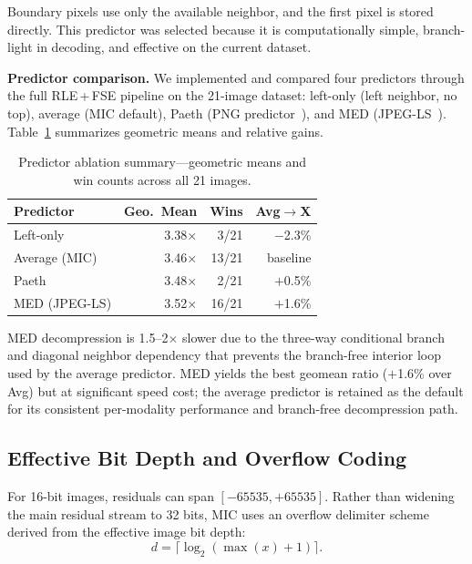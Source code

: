 \documentclass[journal]{IEEEtran}
\begin{document}
Boundary pixels use only the available neighbor, and the first pixel is stored
directly. This predictor was selected because it is computationally simple,
branch-light in decoding, and effective on the current dataset.

\textbf{Predictor comparison.} We implemented and compared four predictors
through the full RLE\,+\,FSE pipeline on the 21-image dataset: left-only (left
neighbor, no top), average (MIC default), Paeth (PNG predictor~\cite{png}), and
MED (JPEG-LS~\cite{loco1}). Table~\ref{tab:predictor-summary} summarizes
geometric means and relative gains.

\begin{table}[htbp]
\centering
\caption{Predictor ablation summary---geometric means and win counts across all
21 images.}
\label{tab:predictor-summary}
\begin{tabular}{lrrr}
\toprule
Predictor & Geo.\ Mean & Wins & Avg$\to$X \\
\midrule
Left-only & 3.38$\times$ & 3/21 & $-$2.3\% \\
Average (MIC) & 3.46$\times$ & 13/21 & baseline \\
Paeth & 3.48$\times$ & 2/21 & $+$0.5\% \\
MED (JPEG-LS) & 3.52$\times$ & 16/21 & $+$1.6\% \\
\bottomrule
\end{tabular}
\end{table}

MED decompression is 1.5--2$\times$ slower due to the three-way conditional
branch and diagonal neighbor dependency that prevents the branch-free interior
loop used by the average predictor. MED yields the best geomean ratio
($+$1.6\% over Avg) but at significant speed cost; the average predictor is
retained as the default for its consistent per-modality performance and
branch-free decompression path.

\subsection{Effective Bit Depth and Overflow Coding}

For 16-bit images, residuals can span $[-65535, +65535]$. Rather than widening
the main residual stream to 32 bits, MIC uses an overflow delimiter scheme
derived from the effective image bit depth:
\begin{equation}
  d = \lceil \log_2(\max(x) + 1) \rceil.
\end{equation}
\end{document}
